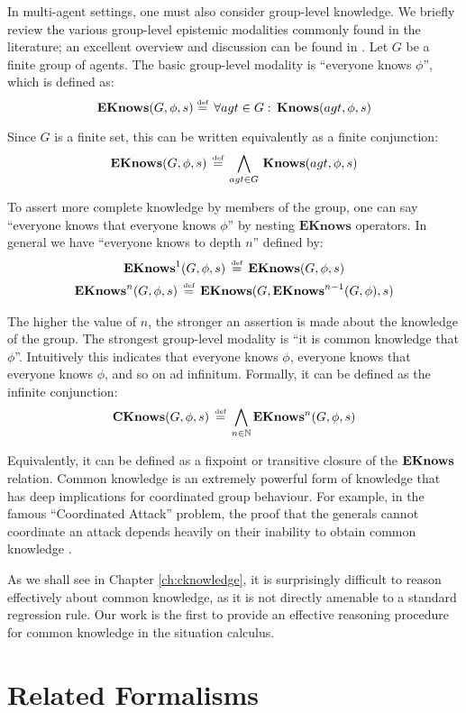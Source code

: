 In multi-agent settings, one must also consider group-level knowledge.
We briefly review the various group-level epistemic modalities commonly
found in the literature; an excellent overview and discussion can
be found in \citep{halpern90knowledge_distrib}. Let $G$ be a finite
group of agents. The basic group-level modality is {}``everyone knows
$\phi$'', which is defined as:\[
\mathbf{EKnows}(G,\phi,s)\stackrel{\mbox{\tiny def}}{=}\,\forall agt\in G:\,\mathbf{Knows}(agt,\phi,s)\]


Since $G$ is a finite set, this can be written equivalently as a
finite conjunction:\[
\mathbf{EKnows}(G,\phi,s)\,\stackrel{\mbox{\tiny def}}{=}\,\bigwedge_{agt\in G}\,\mathbf{Knows}(agt,\phi,s)\]


To assert more complete knowledge by members of the group, one can
say {}``everyone knows that everyone knows $\phi$'' by nesting
$\mathbf{EKnows}$ operators. In general we have {}``everyone knows
to depth $n$'' defined by:\begin{gather*}
\mathbf{EKnows}^{1}(G,\phi,s)\,\stackrel{\mbox{\tiny def}}{=}\,\mathbf{EKnows}(G,\phi,s)\\
\mathbf{EKnows}^{n}(G,\phi,s)\,\stackrel{\mbox{\tiny def}}{=}\,\mathbf{EKnows}(G,\mathbf{EKnows}^{n-1}(G,\phi),s)\end{gather*}


The higher the value of $n$, the stronger an assertion is made about
the knowledge of the group. The strongest group-level modality is
{}``it is common knowledge that $\phi$''. Intuitively this indicates
that everyone knows $\phi$, everyone knows that everyone knows $\phi$,
and so on ad infinitum. Formally, it can be defined as the infinite
conjunction:\[
\mathbf{CKnows}(G,\phi,s)\,\stackrel{\mbox{\tiny def}}{=}\,\bigwedge_{n\in\mathbb{N}}\mathbf{EKnows}^{n}(G,\phi,s)\]


Equivalently, it can be defined as a fixpoint or transitive closure
of the $\mathbf{EKnows}$ relation. Common knowledge is an extremely powerful
form of knowledge that has deep implications for coordinated group
behaviour. For example, in the famous {}``Coordinated Attack'' problem,
the proof that the generals cannot coordinate an attack depends heavily
on their inability to obtain common knowledge \citep{halpern90knowledge_distrib}.

As we shall see in Chapter \ref{ch:cknowledge}, it is surprisingly
difficult to reason effectively about common knowledge, as it is not
directly amenable to a standard regression rule. Our work is the first
to provide an effective reasoning procedure for common knowledge in
the situation calculus.


\section{Related Formalisms}

